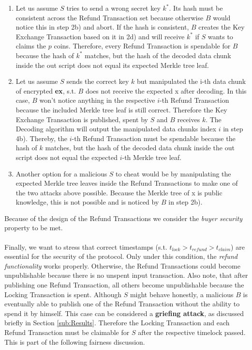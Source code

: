 \documentclass{cacthesis}
\newcounter{protocol}
\begin{document}
        \begin{enumerate}
            \item Let us assume $S$ tries to send a wrong secret key $k^*$. Its hash must be consistent across the Refund Transaction set because otherwise $B$ would notice this in step 2b) and abort. If the hash is consistent, $B$ creates the Key Exchange Transaction based on it in 2d) and will receive $k^*$ if $S$ wants to claims the $p$ coins. Therefore, every Refund Transaction is spendable for $B$ because the hash of $k^*$ matches, but the hash of the decoded data chunk inside the out script does not equal its expected Merkle tree leaf.

            \item Let us assume $S$ sends the correct key $k$ but manipulated the i-th data chunk of encrypted \textsf{\textbf{ex}}, s.t. $B$ does not receive the expected \textsf{x} after decoding. In this case, $B$ won't notice anything in the respective $i$-th Refund Transaction because the included Merkle tree leaf is still correct. Therefore the Key Exchange Transaction is published, spent by $S$ and  $B$ receives $k$.  The \textsf{Decoding} algorithm will output the manipulated data chunks index $i$ in step 4b). Thereby, the $i$-th Refund Transaction must be spendable because the hash of $k$ matches, but the hash of the decoded data chunk inside the out script does not equal the expected $i$-th Merkle tree leaf.

            \item Another option for a malicious $S$ to cheat would be by manipulating the expected Merkle tree leaves inside the Refund Transactions to make one of the two attacks above possible. Because the Merkle tree of \textsf{x} is public knowledge, this is not possible and is noticed by $B$ in step 2b). 
        \end{enumerate}
        Because of the design of the Refund Transactions we consider the \textit{buyer security} property to be met. \\\\
        Finally, we want to stress that correct timestamps (s.t. $t_{lock} > t_{refund} > t_{claim}$) are essential for the security of the protocol. Only under this condition, the \textit{refund functionality} works properly. Otherwise, the Refund Transactions could become unpublishable because there is no unspent input transaction. Also note, that after publishing one Refund Transaction, all others become unpublishable because the Locking Transaction is spent. Although $S$ might behave honestly, a malicious $B$ is eventually able to publish one of the Refund Transaction without the ability to spend it by himself. This case can be considered a \textbf{griefing attack}, as discussed briefly in Section \ref{sub:Results}. Therefore the Locking Transaction and each Refund Transaction must be claimable for $S$ after the respective timelock passed. This is part of the following fairness discussion.
\end{document}
